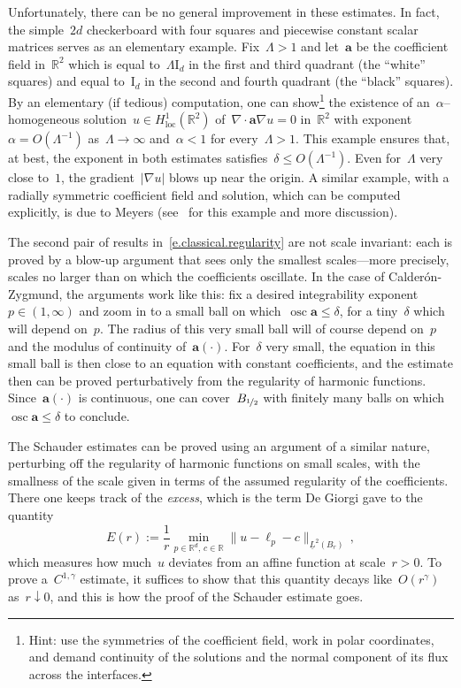 \documentclass[11pt,twoside]{article} %
\numberwithin{equation}{section}
\theoremstyle{definition}
\newcommand*{\Id}{\ensuremath{\mathrm{I}_d}}
\newcommand*{\R}{\ensuremath{\mathbb{R}}}
\newcommand*{\Rd}{\ensuremath{\mathbb{R}^d}}
\renewcommand{\a}{\mathbf{a}}
\DeclareMathOperator*{\osc}{osc}
\begin{document}
Unfortunately, there can be no general improvement in these estimates. In fact, the simple~$2d$ checkerboard with four squares and piecewise constant scalar matrices serves as an elementary example. Fix~$\Lambda>1$ and let~$\a$ be the coefficient field in~$\R^2$ which is equal to~$\Lambda  \Id$ in the first and third quadrant (the ``white'' squares) and equal to~$\Id$ in the second and fourth quadrant (the ``black'' squares).  
By an elementary (if tedious) computation, 
one can show\footnote{Hint: use the symmetries of the coefficient field, work in polar coordinates, and demand continuity of the solutions and the normal component of its flux across the interfaces.} the existence of an~$\alpha$--homogeneous solution~$u \in H^1_{\mathrm{loc}}(\R^2)$ of~$\nabla \cdot \a\nabla u = 0$ in~$\R^2$ with exponent~$\alpha = O(\Lambda^{-1})$ as~$\Lambda \to \infty$ and~$\alpha < 1$ for every~$\Lambda > 1$. 
This example ensures that, at best, the exponent in both estimates satisfies~$\delta \leq O(\Lambda^{-1})$. Even for~$\Lambda$ very close to~$1$, the gradient~$|\nabla u|$ blows up near the origin. 
A similar example, with a radially symmetric coefficient field and solution, which can be computed explicitly, is due to Meyers (see~\cite[Chapter 3]{AKMBook} for this example and more discussion).


\smallskip

The second pair of results in~\eqref{e.classical.regularity} are not scale invariant: each is proved by a blow-up argument that sees only the smallest scales---more precisely, scales no larger than on which the coefficients oscillate. In the case of Calder\'on-Zygmund, the arguments work like this: fix a desired integrability exponent~$p\in(1,\infty)$ and zoom in to a small ball on which~$\osc \a \leq \delta$, for a tiny~$\delta$ which will depend on~$p$. The radius of this very small ball will of course depend on~$p$ and the modulus of continuity of~$\a(\cdot)$. For~$\delta$ very small, the equation in this small ball is then close to an equation with constant coefficients, and the estimate then can be proved perturbatively from the regularity of harmonic functions. Since~$\a(\cdot)$ is continuous, one can cover~$B_{\nicefrac12}$ with finitely many balls on which~$\osc \a \leq \delta$  to conclude. 

\smallskip

The Schauder estimates can be proved using an argument of a similar nature, perturbing off the regularity of harmonic functions on small scales, with the smallness of the scale given in terms of the assumed regularity of the coefficients. There one keeps track of the \emph{excess}, which is the term De Giorgi gave to the quantity 
\begin{equation}
\label{e.excess}
E(r) := \frac1r \min_{p \in\Rd, \, c\in\R} \| u - \ell_p - c \|_{\underline{L}^2(B_r)}
\,,
\end{equation}
which measures how much~$u$ deviates from an affine function at scale~$r>0$. To prove a~$C^{1,\gamma}$ estimate, it suffices to show that this quantity decays like~$O(r^\gamma)$ as~$r \downarrow 0$, and this is how the proof of the Schauder estimate goes. 
\end{document}
